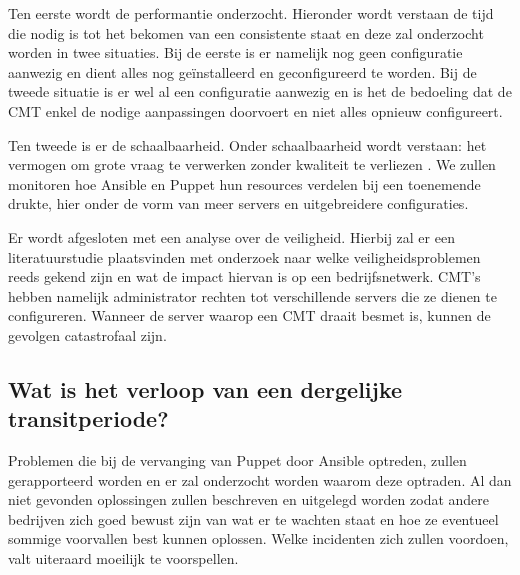  Ten eerste wordt de performantie onderzocht. Hieronder wordt verstaan de tijd die nodig is tot het bekomen van een consistente staat en deze zal onderzocht worden in twee situaties. Bij de eerste is er namelijk nog geen configuratie aanwezig en dient alles nog ge\"installeerd en geconfigureerd te worden. Bij de tweede situatie is er wel al een configuratie aanwezig en is het de bedoeling dat de \gls{CMT} enkel de nodige aanpassingen doorvoert en niet alles opnieuw configureert. 

Ten tweede is er de schaalbaarheid. Onder schaalbaarheid wordt verstaan: het vermogen om grote vraag te verwerken zonder kwaliteit te verliezen \autocite{informit}. We zullen monitoren hoe Ansible en Puppet hun resources verdelen bij een toenemende drukte, hier onder de vorm van meer servers en uitgebreidere configuraties. 

Er wordt afgesloten met een analyse over de veiligheid. Hierbij zal er een literatuurstudie plaatsvinden met onderzoek naar welke veiligheidsproblemen reeds gekend zijn en wat de impact hiervan is op een bedrijfsnetwerk. \gls{CMT}'s hebben namelijk  administrator rechten tot verschillende servers die ze dienen te configureren. Wanneer de server waarop een \gls{CMT} draait besmet is, kunnen de gevolgen catastrofaal zijn.

\subsection{Wat is het verloop van een dergelijke transitperiode?}

Problemen die bij de vervanging van Puppet door Ansible optreden, zullen gerapporteerd worden en er zal onderzocht worden waarom deze optraden. Al dan niet gevonden oplossingen zullen beschreven en uitgelegd worden zodat andere bedrijven zich goed bewust zijn van wat er te wachten staat en hoe ze eventueel sommige voorvallen best kunnen oplossen. Welke incidenten zich zullen voordoen, valt uiteraard moeilijk te voorspellen. 





